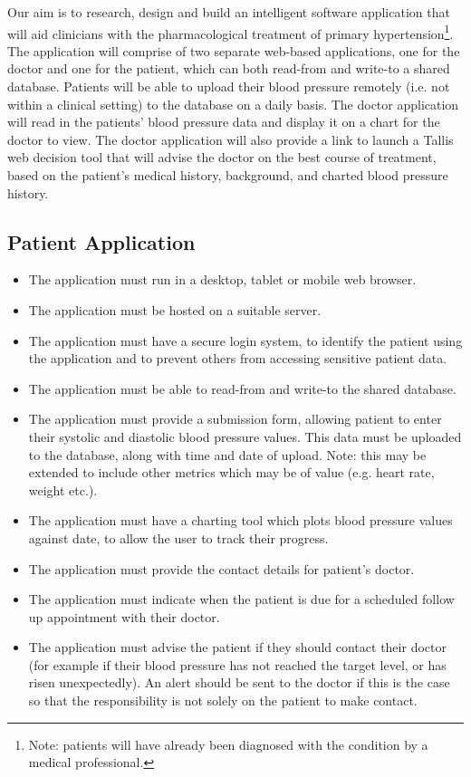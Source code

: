 \documentclass[11pt]{article}
\begin{document}
Our aim is to research, design and build an intelligent software application that will aid clinicians with the pharmacological treatment of primary hypertension\footnote{Note: patients will have already been diagnosed with the condition by a medical professional.}. The application will comprise of two separate web-based applications, one for the doctor and one for the patient, which can both read-from and write-to a shared database. Patients will be able to upload their blood pressure remotely (i.e. not within a clinical setting) to the database on a daily basis. The doctor application will read in the patients' blood pressure data and display it on a chart for the doctor to view. The doctor application will also provide a link to launch a Tallis web decision tool that will advise the doctor on the best course of treatment, based on the patient's medical history, background, and charted blood pressure history.

\subsection{Patient Application}
\begin{itemize}
\item The application must run in a desktop, tablet or mobile web browser.
\item The application must be hosted on a suitable server.
\item The application must have a secure login system, to identify the patient using the application and to prevent others from accessing sensitive patient data.
\item The application must be able to read-from and write-to the shared database.
\item The application must provide a submission form, allowing patient to enter their systolic and diastolic blood pressure values. This data must be uploaded to the database, along with time and date of upload. Note: this may be extended to include other metrics which may be of value (e.g. heart rate, weight etc.).
\item The application must have a charting tool which plots blood pressure values against date, to allow the user to track their progress.
\item The application must provide the contact details for patient's doctor.
\item The application must indicate when the patient is due for a scheduled follow up appointment with their doctor.
\item The application must advise the patient if they should contact their doctor (for example if their blood pressure has not reached the target level, or has risen unexpectedly). An alert should be sent to the doctor if this is the case so that the responsibility is not solely on the patient to make contact.
\end{itemize}
\end{document}
